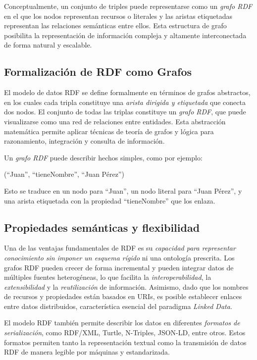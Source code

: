 \documentclass{article}
\begin{document}
Conceptualmente, un conjunto de triples puede representarse como un \textit{grafo RDF} en el que los nodos representan recursos o literales y las aristas etiquetadas representan las relaciones semánticas entre ellos. Esta estructura de grafo posibilita la representación de información compleja y altamente interconectada de forma natural y escalable.

\subsection{Formalización de RDF como Grafos}

El modelo de datos RDF se define formalmente en términos de grafos abstractos, en los cuales cada tripla constituye una \textit{arista dirigida y etiquetada} que conecta dos nodos. El conjunto de todas las triplas constituye un \textit{grafo RDF}, que puede visualizarse como una red de relaciones entre entidades. Esta abstracción matemática permite aplicar técnicas de teoría de grafos y lógica para razonamiento, integración y consulta de información.

Un \textit{grafo RDF} puede describir hechos simples, como por ejemplo:

\begin{center}
    (``Juan'', ``tieneNombre'', ``Juan Pérez'')
\end{center}

Esto se traduce en un nodo para ``Juan'', un nodo literal para ``Juan Pérez'', y una arista etiquetada con la propiedad ``tieneNombre'' que los enlaza.

\subsection{Propiedades semánticas y flexibilidad}

Una de las ventajas fundamentales de RDF es su \textit{capacidad para representar conocimiento sin imponer un esquema rígido} ni una ontología prescrita. Los grafos RDF pueden crecer de forma incremental y pueden integrar datos de múltiples fuentes heterogéneas, lo que facilita la \textit{interoperabilidad}, la \textit{extensibilidad} y la \textit{reutilización} de información. Asimismo, dado que los nombres de recursos y propiedades están basados en URIs, es posible establecer enlaces entre datos distribuidos, característica esencial del paradigma \textit{Linked Data}.

El modelo RDF también permite describir los datos en diferentes \textit{formatos de serialización}, como RDF/XML, Turtle, N-Triples, JSON-LD, entre otros. Estos formatos permiten tanto la representación textual como la transmisión de datos RDF de manera legible por máquinas y estandarizada.
\end{document}
